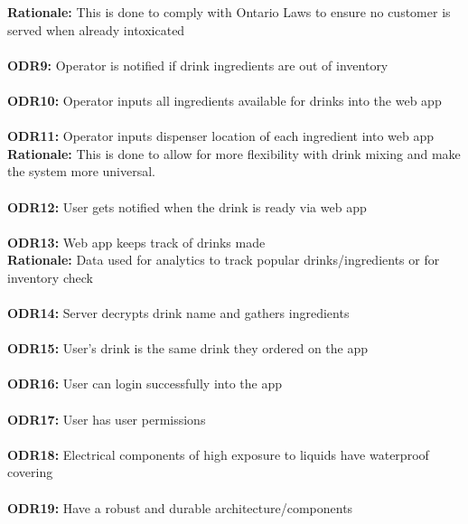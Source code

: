 \documentclass{article}
\begin{document}
    \textbf{Rationale:} This is done to comply with Ontario Laws to ensure no customer is served when already intoxicated\\\\
    \textbf{ODR9:} Operator is notified if drink ingredients are out of inventory\\\\
    \textbf{ODR10:} Operator inputs all ingredients available for drinks into the web app\\\\
    \textbf{ODR11:} Operator inputs dispenser location of each ingredient into web app\\

    \textbf{Rationale:} This is done to allow for more flexibility with drink mixing and make the system more universal.\\\\
    \textbf{ODR12:} User gets notified when the drink is ready via web app\\\\
    \textbf{ODR13:} Web app keeps track of drinks made\\

    \textbf{Rationale:} Data used for analytics to track popular drinks/ingredients or for inventory check\\\\
    \textbf{ODR14:} Server decrypts drink name and gathers ingredients\\\\
    \textbf{ODR15:} User's drink is the same drink they ordered on the app \\\\
    \textbf{ODR16:} User can login successfully into the app \\\\
    \textbf{ODR17:} User has user permissions  \\\\
    \textbf{ODR18:} Electrical components of high exposure to liquids have waterproof covering\\\\
    \textbf{ODR19:} Have a robust and durable architecture/components
\end{document}
